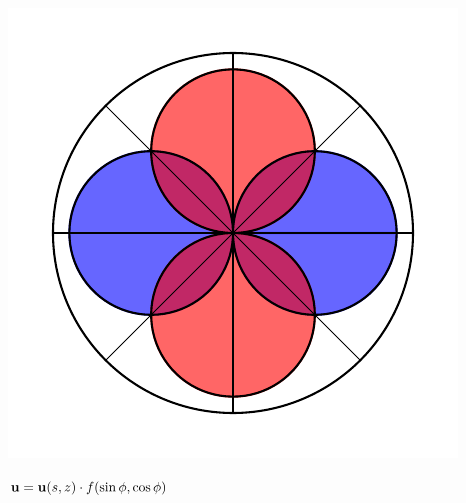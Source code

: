 \documentclass{article}
\renewcommand{\vec}[1]{\ensuremath{\mathbf{#1}}}
\begin{document}
\begin{center}
\begin{minipage}[t]{0.4\paperwidth}
        \begin{minipage}[c]{0.1\paperwidth}
            \includegraphics[width=\textwidth]{radpat_di.pdf}
        \end{minipage}%
        \begin{minipage}[c]{0.4\paperwidth}
            $\scriptsize{\vec u = \vec u (s,z)} \cdot f(\sin\phi, \cos\phi)$ \\
        \end{minipage}


\end{minipage}
\end{center}
\end{document}
